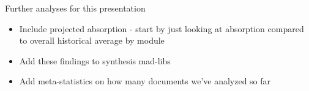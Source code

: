 \documentclass[ignorenonframetext,]{beamer}
\providecommand{\tightlist}{%
  \setlength{\itemsep}{0pt}\setlength{\parskip}{0pt}}
\begin{document}
\begin{frame}{Further analyses for this presentation}
\protect\hypertarget{further-analyses-for-this-presentation}{}

\begin{itemize}
\tightlist
\item
  Include projected absorption - start by just looking at absorption
  compared to overall historical average by module
\item
  Add these findings to synthesis mad-libs
\item
  Add meta-statistics on how many documents we've analyzed so far
\end{itemize}

\end{frame}
\end{document}
